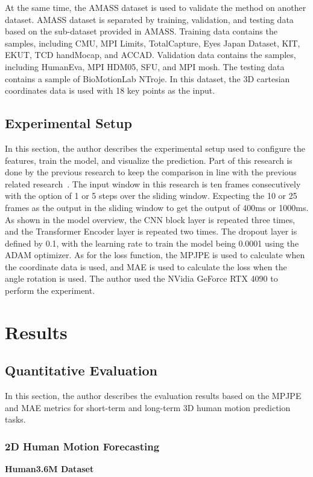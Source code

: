 At the same time, the AMASS dataset is used to validate the method on another dataset. AMASS dataset is separated by training, validation, and testing data based on the sub-dataset provided in AMASS. Training data contains the samples, including CMU, MPI Limits, TotalCapture, Eyes Japan Dataset, KIT, EKUT, TCD handMocap, and ACCAD. 
Validation data contains the samples, including HumanEva, MPI HDM05, SFU, and MPI mosh. The testing data contains a sample of BioMotionLab NTroje. In this dataset, the 3D cartesian coordinates data is used with 18 key points as the input.

\subsection{Experimental Setup}\label{4:experiment_setup}
In this section, the author describes the experimental setup used to configure the features, train the model, and visualize the prediction. Part of this research is done by the previous research to keep the comparison in line with the previous related research~\cite{motionmixer2022}. The input window in this research is ten frames consecutively with the option of 1 or 5 steps over the sliding window. Expecting the 10 or 25 frames as the output in the sliding window to get the output of 400ms or 1000ms. As shown in the model overview, the CNN block layer is repeated three times, and the Transformer Encoder layer is repeated two times. The dropout layer is defined by 0.1, with the learning rate to train the model being 0.0001 using the ADAM optimizer. As for the loss function, the MPJPE is used to calculate when the coordinate data is used, and MAE is used to calculate the loss when the angle rotation is used. The author used the NVidia GeForce RTX 4090 to perform the experiment.

\section{Results}\label{4:results}
\subsection{Quantitative Evaluation}\label{4:quant}
In this section, the author describes the evaluation results based on the MPJPE and MAE metrics for short-term and long-term 3D human motion prediction tasks.

\subsubsection{2D Human Motion Forecasting}\label{4:quant_3D}
\textbf{Human3.6M Dataset}

